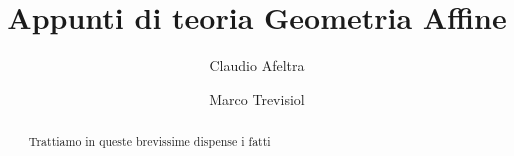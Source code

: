 \documentclass[a4paper,12pt]{article}
\title{Appunti di teoria Geometria Affine}
\author{Claudio Afeltra \and Marco Trevisiol}
\begin{document}
\maketitle


\begin{abstract}
	Trattiamo in queste brevissime dispense i fatti 	
\end{abstract}
\clearpage


%
%
%
%
%
%
\end{document}
